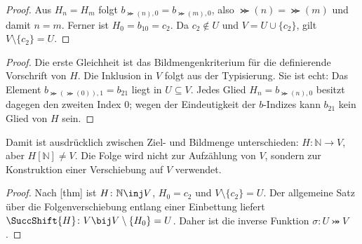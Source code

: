 \documentclass[main.tex]{subfiles}
\begin{document}
\begin{proof}
Aus \(H_n=H_m\) folgt
\(b_{\Succ(n),0}=b_{\Succ(m),0}\), also \(\Succ(n)=\Succ(m)\) und
damit \(n=m\). Ferner ist \(H_0=b_{10}=c_2\). Da \(c_2\notin U\) und
\(V=U\cup\{c_2\}\), gilt \(V\setminus\{c_2\}=U\).
\end{proof}

\begin{proof}
Die erste Gleichheit ist das Bildmengenkriterium für die definierende
Vorschrift von \(H\). Die Inklusion in \(V\) folgt aus der Typisierung.
Sie ist echt: Das Element \(b_{\Succ(\Succ(0)),1}=b_{21}\) liegt in
\(U\subseteq V\). Jedes Glied \(H_n=b_{\Succ(n),0}\) besitzt dagegen den
zweiten Index \(0\); wegen der Eindeutigkeit der \(b\)-Indizes kann
\(b_{21}\) kein Glied von \(H\) sein.
\end{proof}

Damit ist ausdrücklich zwischen Ziel- und Bildmenge unterschieden:
\(H\colon\mathbb N\to V\), aber \(H[\mathbb N]\neq V\). Die Folge wird
nicht zur Aufzählung von \(V\), sondern zur Konstruktion einer Verschiebung
auf \(V\) verwendet.


\begin{proof}
Nach [thm] ist
\(H\colon\mathbb N\inj V\), \(H_0=c_2\) und
\(V\setminus\{c_2\}=U\). Der allgemeine Satz über die Folgenverschiebung
entlang einer Einbettung liefert
\(\SuccShift{H}\colon V\bij V\setminus\{H_0\}=U\). Daher ist die inverse
Funktion \(\sigma\colon U\bij V\).
\end{proof}
\end{document}
